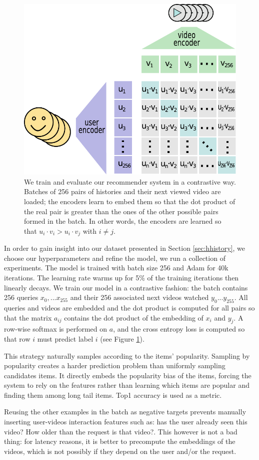 \begin{figure}
    \centering
    \includegraphics[width=0.5\columnwidth]{70-files/contrastive.pdf}
    \caption{We train and evaluate our recommender system in a contrastive way. Batches of 256 pairs of histories and their next viewed video are loaded; the encoders learn to embed them so that the dot product of the real pair is greater than the ones of the other possible pairs formed in the batch. In other words, the encoders are learned so that $u_i \cdot v_i > u_i \cdot v_j$ with $i \neq j$.}
    \label{fig:rec-contrastive}
\end{figure}

In order to gain insight into our dataset presented in Section \ref{sec:hhistory}, we choose our hyperparameters and refine the model, we run a collection of experiments. The model is trained with batch size 256 and Adam for 40k iterations. The learning rate warms up for 5\% of the training iterations then linearly decays. We train our model in a contrastive fashion: the batch contains 256 queries $x_{0},...x_{255}$ and their 256 associated next videos watched $y_{0}...y_{255}$. All queries and videos are embedded and the dot product is computed for all pairs so that the matrix $a_{ij}$ contains the dot product of the embedding of $x_i$ and $y_j$. A row-wise softmax is performed on $a$, and the cross entropy loss is computed so that row $i$ must predict label $i$ (see Figure \ref{fig:rec-contrastive}). 

This strategy naturally samples according to the items' popularity. Sampling by popularity creates a harder prediction problem than uniformly sampling candidates items. It directly embeds the popularity bias of the items, forcing the system to rely on the features rather than learning which items are popular and finding them among long tail items. Top1 accuracy is used as a metric.

Reusing the other examples in the batch as negative targets prevents manually inserting user-videos interaction features such as: has the user already seen this video? How older than the request is that video?. This however is not a bad thing: for latency reasons, it is better to precompute the embeddings of the videos, which is not possibly if they depend on the user and/or the request.

